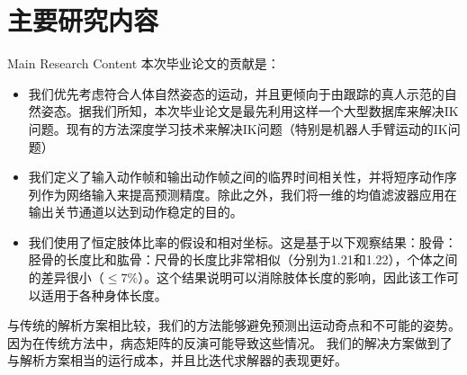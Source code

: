 \section{主要研究内容}{Main Research Content}
本次毕业论文的贡献是：
\begin{itemize}
\item 我们优先考虑符合人体自然姿态的运动，并且更倾向于由跟踪的真人示范的自然姿态。据我们所知，本次毕业论文是最先利用这样一个大型数据库来解决IK问题。现有的方法深度学习技术来解决IK问题（特别是机器人手臂运动的IK问题）
\item 我们定义了输入动作帧和输出动作帧之间的临界时间相关性，并将短序动作序列作为网络输入来提高预测精度。除此之外，我们将一维的均值滤波器应用在输出关节通道以达到动作稳定的目的。
\item 我们使用了恒定肢体比率的假设和相对坐标。这是基于以下观察结果：股骨：胫骨的长度比和肱骨：尺骨的长度比非常相似（分别为1.21和1.22），个体之间的差异很小（$\le7\%$）\cite{pietak2013fundamental}。这个结果说明可以消除肢体长度的影响，因此该工作可以适用于各种身体长度。
\end{itemize}

与传统的解析方案相比较，我们的方法能够避免预测出运动奇点和不可能的姿势。因为在传统方法中，病态矩阵的反演可能导致这些情况。 我们的解决方案做到了与解析方案相当的运行成本，并且比迭代求解器的表现更好。
